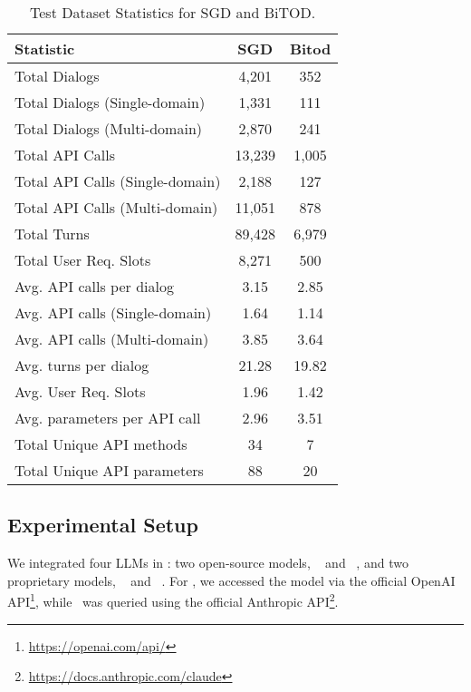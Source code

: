 \begin{table}[t]
    \centering
    \renewcommand{\arraystretch}{1.2}
    \begin{adjustbox}{max width=0.40\textwidth}
        \begin{tabular}{lcc}
            \toprule
            \textbf{Statistic} & \textbf{SGD} & \textbf{Bitod} \\
            \midrule
            Total Dialogs & 4,201 & 352 \\
            Total Dialogs (Single-domain) & 1,331 & 111 \\
            Total Dialogs (Multi-domain) & 2,870 & 241 \\ 
            Total API Calls & 13,239 & 1,005 \\
            Total API Calls (Single-domain) & 2,188 & 127 \\
            Total API Calls (Multi-domain) & 11,051 & 878 \\
            Total Turns & 89,428 & 6,979 \\ 
            Total User Req. Slots & 8,271 & 500 \\ \hline
            Avg. API calls per dialog & 3.15 & 2.85 \\
            Avg. API calls (Single-domain) & 1.64 & 1.14 \\
            Avg. API calls (Multi-domain) & 3.85 & 3.64 \\
            Avg. turns per dialog & 21.28 & 19.82 \\
            Avg. User Req. Slots & 1.96 & 1.42 \\
            Avg. parameters per API call & 2.96 & 3.51\\ \hline
            Total Unique API methods & 34 & 7\\ %
            Total Unique API parameters & 88 & 20\\ %
            \bottomrule
        \end{tabular}
    \end{adjustbox}
    \caption{Test Dataset Statistics for SGD and BiTOD.
    }
    \label{tab:sgd_bitod_comparison}
    \vspace{-10pt}
\end{table}

\subsection{Experimental Setup} 

We integrated four LLMs in {\ours}: two open-source models, \DeepSeekLongName\ \cite{liu2024deepseek} and \LlamaLongName\ \cite{dubey2024llama}, and two proprietary models, \GPTLongName\ \cite{achiam2023gpt} and \ClaudeLongName\ \cite{anthropic2023claude}. For \GPTLongName, we accessed the model via the official OpenAI API\footnote{\url{https://openai.com/api/}}, while \ClaudeLongName\ was queried using the official Anthropic API\footnote{\url{https://docs.anthropic.com/claude}}.

